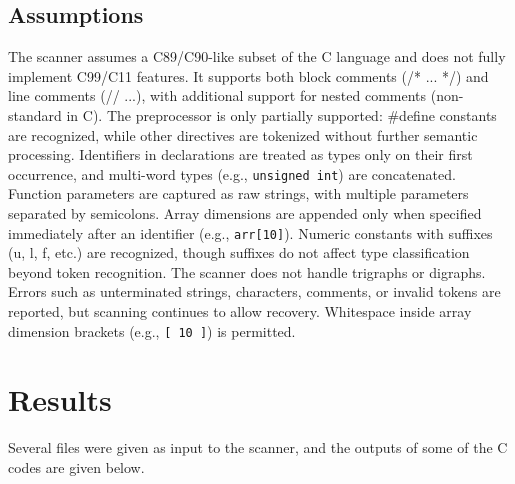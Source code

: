 \documentclass[12pt]{article}
\begin{document}
\subsection{Assumptions}
The scanner assumes a C89/C90-like subset of the C language and does not fully implement C99/C11 features. It supports both block comments (/* ... */) and line comments (// ...), with additional support for nested comments (non-standard in C). The preprocessor is only partially supported: \#define constants are recognized, while other directives are tokenized without further semantic processing. Identifiers in declarations are treated as types only on their first occurrence, and multi-word types (e.g., \texttt{unsigned int}) are concatenated. Function parameters are captured as raw strings, with multiple parameters separated by semicolons. Array dimensions are appended only when specified immediately after an identifier (e.g., \texttt{arr[10]}). Numeric constants with suffixes (u, l, f, etc.) are recognized, though suffixes do not affect type classification beyond token recognition. The scanner does not handle trigraphs or digraphs. Errors such as unterminated strings, characters, comments, or invalid tokens are reported, but scanning continues to allow recovery. Whitespace inside array dimension brackets (e.g., \texttt{[ 10 ]}) is permitted.

\section{Results}
Several files were given as input to the scanner, and the outputs of some of the C codes are given below.
\end{document}
